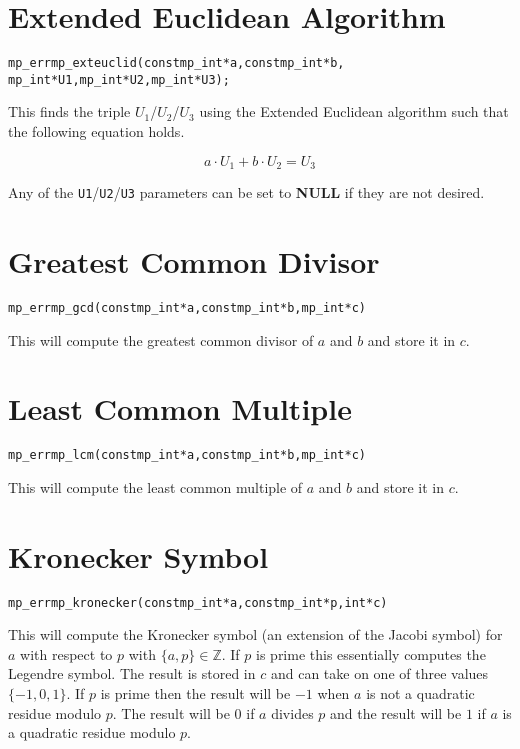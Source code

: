 \documentclass[synpaper]{book}
\begin{document}
\section{Extended Euclidean Algorithm}
\begin{alltt}
mp_err mp_exteuclid(const mp_int *a, const mp_int *b,
                 mp_int *U1, mp_int *U2, mp_int *U3);
\end{alltt}

This finds the triple $U_1$/$U_2$/$U_3$ using the Extended Euclidean algorithm such that the
following equation holds.

\begin{equation}
  a \cdot U_1 + b \cdot U_2 = U_3
\end{equation}

Any of the \texttt{U1}/\texttt{U2}/\texttt{U3} parameters can be set to \textbf{NULL} if they are
not desired.

\section{Greatest Common Divisor}
\begin{alltt}
mp_err mp_gcd (const mp_int *a, const mp_int *b, mp_int *c)
\end{alltt}
This will compute the greatest common divisor of $a$ and $b$ and store it in $c$.

\section{Least Common Multiple}
\begin{alltt}
mp_err mp_lcm (const mp_int *a, const mp_int *b, mp_int *c)
\end{alltt}
This will compute the least common multiple of $a$ and $b$ and store it in $c$.

\section{Kronecker Symbol}
\begin{alltt}
mp_err mp_kronecker (const mp_int *a, const mp_int *p, int *c)
\end{alltt}
This will compute the Kronecker symbol (an extension of the Jacobi symbol) for $a$ with respect to
$p$ with $\lbrace a, p \rbrace \in \mathbb{Z}$.  If $p$ is prime this essentially computes the
Legendre symbol. The result is stored in $c$ and can take on one of three values $\lbrace -1, 0, 1
  \rbrace$.  If $p$ is prime then the result will be $-1$ when $a$ is not a quadratic residue
modulo
$p$.  The result will be $0$ if $a$ divides $p$ and the result will be $1$ if $a$ is a quadratic
residue modulo $p$.
\end{document}
